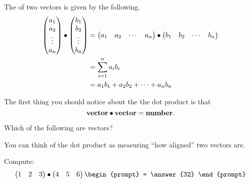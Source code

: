 \documentclass{ximera}
\begin{document}
 \begin{definition}
  The  of two vectors is given by the following.
  \begin{align*}
  \begin{pmatrix}
    a_1\\
    a_2\\
    \vdots\\
    a_n
  \end{pmatrix}
  \bullet
  \begin{pmatrix}
    b_1\\
    b_2\\
    \vdots\\
    b_n
  \end{pmatrix}
  &=\begin{pmatrix} a_1 & a_2 & \cdots & a_n\end{pmatrix}\bullet\begin{pmatrix} b_1 & b_2 & \cdots & b_n\end{pmatrix}\\
  &= \sum_{i=1}^n a_ib_i\\
  &= a_1b_1 + a_2b_2 +\dots+a_nb_n
  \end{align*}
\end{definition}

The first thing you should notice about the the dot product is that
\[
\mathbf{vector}\bullet \mathbf{vector} = \mathbf{number}.
\]


\begin{question}
  Which of the following are vectors?
  \begin{selectAll}
    \end{selectAll}
\end{question}


You can think of the dot product as measuring ``how aligned'' two vectors are.
\begin{question}
  Compute:
  \[
  \begin{pmatrix}1 & 2 & 3\end{pmatrix}\dotp\begin{pmatrix}4 & 5 & 6\end{pmatrix}
  \begin{prompt}
    = \answer{32}
  \end{prompt}
  \]
\end{question}
\end{document}
